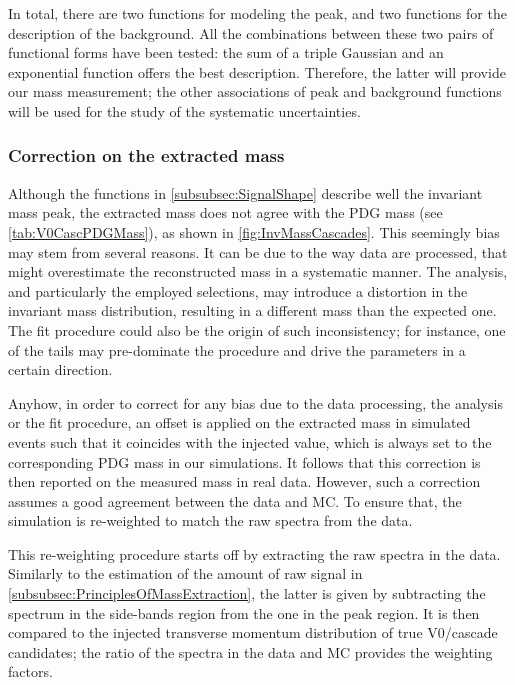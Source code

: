 In total, there are two functions for modeling the peak, and two functions for the description of the background. All the combinations between these two pairs of functional forms have been tested: the sum of a triple Gaussian and an exponential function offers the best description. Therefore, the latter will provide our mass measurement; the other associations of peak and background functions will be used for the study of the systematic uncertainties.


\subsubsection{Correction on the extracted mass}
\label{subsubsec:CorrectionOnTheExtractedMass}

Although the functions in \Sec\ref{subsubsec:SignalShape} describe well the invariant mass peak, the extracted mass does not agree with the PDG mass (see \tab\ref{tab:V0CascPDGMass}), as shown in \figs\ref{fig:InvMassCascades}. This seemingly bias may stem from several reasons. It can be due to the way data are processed, that might overestimate the reconstructed mass in a systematic manner. The analysis, and particularly the employed selections, may introduce a distortion in the invariant mass distribution, resulting in a different mass than the expected one. The fit procedure could also be the origin of such inconsistency; for instance, one of the tails may pre-dominate the procedure and drive the parameters in a certain direction.

Anyhow, in order to correct for any bias due to the data processing, the analysis or the fit procedure, an offset is applied on the extracted mass in simulated events such that it coincides with the injected value, which is always set to the corresponding PDG mass in our simulations. It follows that this correction is then reported on the measured mass in real data. However, such a correction assumes a good agreement between the data and MC. To ensure that, the simulation is re-weighted to match the raw \pT spectra from the data.

This re-weighting procedure starts off by extracting the raw \pT spectra in the data. Similarly to the estimation of the amount of raw signal in \Sec\ref{subsubsec:PrinciplesOfMassExtraction}, the latter is given by subtracting the \pT spectrum in the side-bands region from the one in the peak region. It is then compared to the injected transverse momentum distribution of true V0/cascade candidates; the ratio of the \pT spectra in the data and MC provides the weighting factors.


